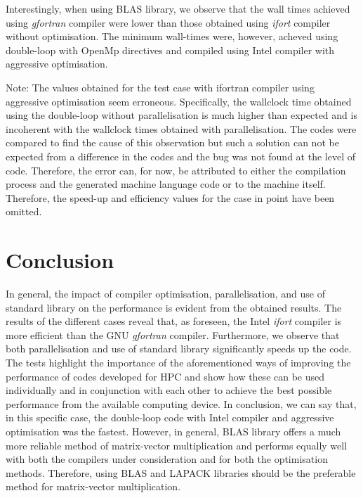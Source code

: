 \documentclass[11pt, oneside]{article}   	%
\begin{document}
Interestingly, when using BLAS library, we observe that the wall times achieved using \textit{gfortran} compiler were lower than those obtained using \textit{ifort} compiler without optimisation. The minimum wall-times were, however, acheved using double-loop with OpenMp directives and compiled using Intel compiler with aggressive optimisation.

Note: The values obtained for the test case with ifortran compiler using aggressive optimisation seem erroneous. Specifically, the wallclock time obtained using the double-loop without parallelisation is much higher than expected and is incoherent with the wallclock times obtained with parallelisation. The codes were compared to find the cause of this observation but such a solution can not be expected from a difference in the codes and the bug was not found at the level of code. Therefore, the error can, for now, be attributed to either the compilation process and the generated machine language code or to the machine itself. Therefore, the speed-up and efficiency values for the case in point have been omitted.  

\section{Conclusion}
In general, the impact of compiler optimisation, parallelisation, and use of standard library on the performance is evident from the obtained results. The results of the different cases reveal that, as foreseen, the Intel \textit{ifort} compiler is more efficient than the GNU \textit{gfortran} compiler. Furthermore, we observe that both parallelisation and use of standard library significantly speeds up the code. The tests highlight the importance of the aforementioned ways of improving the performance of codes developed for HPC and show how these can be used individually and in conjunction with each other to achieve the best possible performance from the available computing device. In conclusion, we can say that, in this specific case, the double-loop code with Intel compiler and aggressive optimisation was the fastest. However, in general, BLAS library offers a much more reliable method of matrix-vector multiplication and performs equally well with both the compilers under consideration and for both the optimisation methods. Therefore, using BLAS and LAPACK libraries should be the preferable method for matrix-vector multiplication. 



\end{document}
